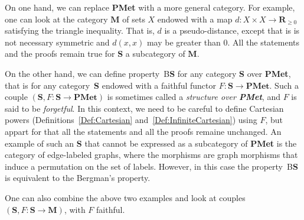 \documentclass[a4paper]{article}
\theoremstyle{definition}
\newcommand*{\field}[1]{\mathbf{#1}}
\newcommand*{\category}[1]{\textbf{#1}}
\newcommand*{\PMet}{\category{PMet}}
\newcommand*{\CatS}{\category{S}}
\newcommand*{\R}{\field{R}}
\newcommand*{\BS}{B\textbf{S}}
\begin{document}
On one hand, we can replace \PMet{} with a more general category.
For example, one can look at the category $\category{M}$ of sets $X$ endowed with a map $d\colon X\times X\to\R_{\geq 0}$ satisfying the triangle inequality.
That is, $d$ is a pseudo-distance, except that is is not necessary symmetric and $d(x,x)$ may be greater than $0$.
All the statements and the proofs remain true for \CatS{} a subcategory of $\category{M}$.

On the other hand, we can define property~\BS{} for any category \CatS{} over \PMet, that is for any category~\CatS{} endowed with a faithful functor $F\colon\CatS\to \PMet$.
Such a couple $(\CatS,F\colon\CatS\to \PMet)$ is sometimes called a \emph{structure over \PMet}, and $F$ is said to be \emph{forgetful}.
In this context, we need to be careful to define Cartesian powers (Definitions~\ref{Def:Cartesian} and~\ref{Def:InfiniteCartesian}) using $F$, but appart for that all the statements and all the proofs remaine unchanged.
An example of such an \CatS{} that cannot be expressed as a subcategory of \PMet{} is the category of edge-labeled graphs, where the morphisms are graph morphisms that induce a permutation on the set of labels.
However, in this case the property~\BS{} is equivalent to the Bergman's property.

One can also combine the above two examples and look at couples $(\CatS,F\colon\CatS\to \category{M})$, with $F$ faithful.
\end{document}

